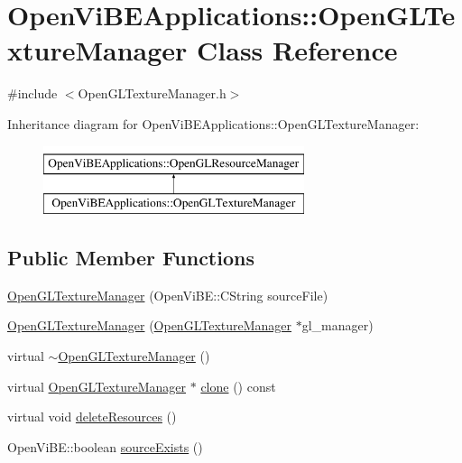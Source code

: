 \hypertarget{classOpenViBEApplications_1_1OpenGLTextureManager}{
\section{OpenViBEApplications::OpenGLTextureManager Class Reference}
\label{classOpenViBEApplications_1_1OpenGLTextureManager}
}


{\ttfamily \#include $<$OpenGLTextureManager.h$>$}

Inheritance diagram for OpenViBEApplications::OpenGLTextureManager:\begin{figure}[H]
\begin{center}
\leavevmode
\includegraphics[height=2.000000cm]{classOpenViBEApplications_1_1OpenGLTextureManager}
\end{center}
\end{figure}
\subsection*{Public Member Functions}
\begin{DoxyCompactItemize}
\item 
\hyperlink{classOpenViBEApplications_1_1OpenGLTextureManager_a2e710896f35d31bff1cc63357dd260fe}{OpenGLTextureManager} (OpenViBE::CString sourceFile)
\item 
\hyperlink{classOpenViBEApplications_1_1OpenGLTextureManager_acdd546094ed3bdfa0f757a0d39b96cfb}{OpenGLTextureManager} (\hyperlink{classOpenViBEApplications_1_1OpenGLTextureManager}{OpenGLTextureManager} $\ast$gl\_\-manager)
\item 
virtual \hyperlink{classOpenViBEApplications_1_1OpenGLTextureManager_ad7b85c83e0fb40b41ce06f36a68ed03a}{$\sim$OpenGLTextureManager} ()
\item 
virtual \hyperlink{classOpenViBEApplications_1_1OpenGLTextureManager}{OpenGLTextureManager} $\ast$ \hyperlink{classOpenViBEApplications_1_1OpenGLTextureManager_a8b129ae37d111bfa79f5aaf76228dfdc}{clone} () const 
\item 
virtual void \hyperlink{classOpenViBEApplications_1_1OpenGLTextureManager_a6d6008cb4bce50fc65dc9cfe9d72265b}{deleteResources} ()
\item 
OpenViBE::boolean \hyperlink{classOpenViBEApplications_1_1OpenGLTextureManager_a66732727be31417d3805bc1509813667}{sourceExists} ()
\end{DoxyCompactItemize}

